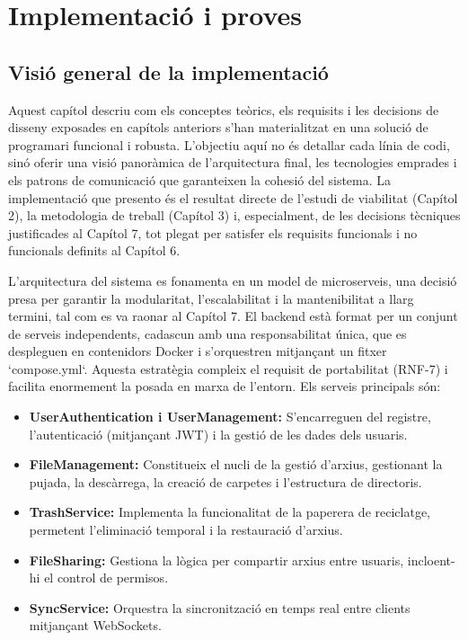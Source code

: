 \chapter{Implementació i proves}

\section{Visió general de la implementació}

Aquest capítol descriu com els conceptes teòrics, els requisits i les decisions de disseny exposades en capítols anteriors s'han materialitzat en una solució de programari funcional i robusta. L'objectiu aquí no és detallar cada línia de codi, sinó oferir una visió panoràmica de l'arquitectura final, les tecnologies emprades i els patrons de comunicació que garanteixen la cohesió del sistema. La implementació que presento és el resultat directe de l'estudi de viabilitat (Capítol 2), la metodologia de treball (Capítol 3) i, especialment, de les decisions tècniques justificades al Capítol 7, tot plegat per satisfer els requisits funcionals i no funcionals definits al Capítol 6.

L'arquitectura del sistema es fonamenta en un model de microserveis, una decisió presa per garantir la modularitat, l'escalabilitat i la mantenibilitat a llarg termini, tal com es va raonar al Capítol 7. El backend està format per un conjunt de serveis independents, cadascun amb una responsabilitat única, que es despleguen en contenidors Docker i s'orquestren mitjançant un fitxer `compose.yml`. Aquesta estratègia compleix el requisit de portabilitat (RNF-7) i facilita enormement la posada en marxa de l'entorn. Els serveis principals són:

\begin{itemize}
    \item \textbf{UserAuthentication i UserManagement:} S'encarreguen del registre, l'autenticació (mitjançant JWT) i la gestió de les dades dels usuaris.
    \item \textbf{FileManagement:} Constitueix el nucli de la gestió d'arxius, gestionant la pujada, la descàrrega, la creació de carpetes i l'estructura de directoris.
    \item \textbf{TrashService:} Implementa la funcionalitat de la paperera de reciclatge, permetent l'eliminació temporal i la restauració d'arxius.
    \item \textbf{FileSharing:} Gestiona la lògica per compartir arxius entre usuaris, incloent-hi el control de permisos.
    \item \textbf{SyncService:} Orquestra la sincronització en temps real entre clients mitjançant WebSockets.
\end{itemize}

